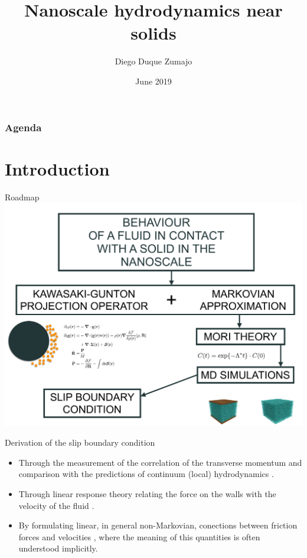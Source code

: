 \documentclass{beamer}
\title{Nanoscale hydrodynamics near solids}
\date{June 2019}
\author{Diego Duque Zumajo}
\institute{Departamento Física Fundamental \\Universidad Nacional de Educación a Distancia}
\begin{document}
\maketitle

\begin{frame}
\frametitle{Agenda}
\tableofcontents
\end{frame}

\section{Introduction}
\begin{frame}{Roadmap}
  \includegraphics[width=\linewidth]{scheme-thesis}
\end{frame}

\begin{frame}{Derivation of the slip boundary condition}
\begin{itemize}
\item Through the  measurement of the correlation of
the  transverse  momentum  and  comparison  with  the  predictions  of
continuum  (local) hydrodynamics  \cite{Bocquet1993,Chen2015}.
\item Through
linear  response theory  relating  the  force on  the  walls with  the
velocity   of  the   fluid   \cite{Bocquet1993,Petravic2007}.
\item By formulating  linear,  in  general  non-Markovian,  conections  between
friction forces and velocities \cite{Hansen2011}, where the meaning of
this quantities is often understood implicitly.
\end{itemize}
\end{frame}
\end{document}
